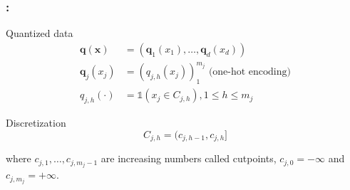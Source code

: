 \documentclass[english,xcolor={rgb,dvipsnames,table,usenames}]{beamer}
\newcommand\q{{\bm{q}}}
\newcommand\s{q}
\newcommand{\bx}{\boldsymbol{x}}
\begin{document}
\begin{frame}[allowframebreaks]
\frametitle{\secname: \subsecname}

%

\begin{block}{Quantized data}
\vspace*{-0.9cm}
\begin{align*}
\q(\bx) & = (\q_1(x_1),\dots,\q_d(x_d)) \\
\q_j(x_j) & = (\s_{j,h}(x_j))_1^{m_j} \text{ (one-hot encoding)} \\
\s_{j,h}(\cdot) & = \mathds{1}(x_j \in C_{j,h}), 1 \leq h \leq m_j
\end{align*}
\vspace*{-0.7cm}
\end{block}

\begin{animateinline}{2}%
{\color{red}{\bf Huge cardinality!}}%
\newframe \end{animateinline}

\pagebreak

\begin{block}{Discretization}
\vspace*{-0.4cm}
\[C_{j,h}=(c_{j,h-1},c_{j,h}]\]

where $c_{j,1},\ldots,c_{j,m_j-1}$ are increasing numbers called cutpoints, $c_{j,0}=-\infty$ and $c_{j,m_j}=+\infty$.
\end{block}

\bigskip

\begin{center}
\end{center}
\end{frame}
\end{document}
